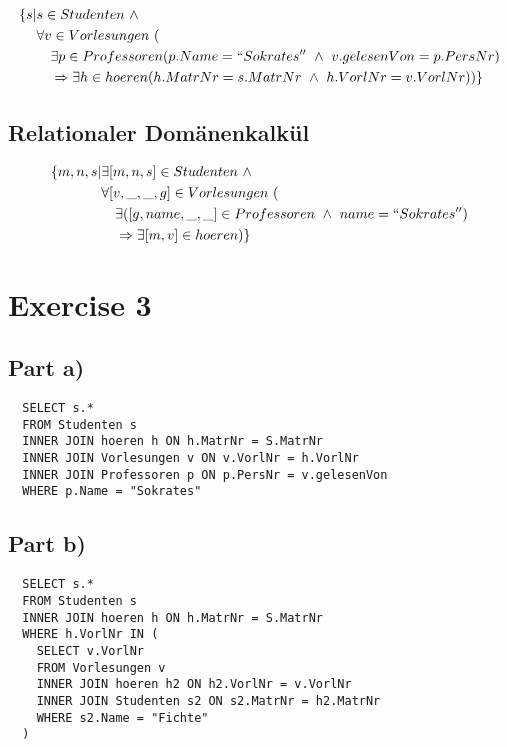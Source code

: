 \documentclass[10pt,a4paper]{article}
\begin{document}
\begin{align*}
  \{ s | & s \in Studenten\ \land\\
         & \forall v \in Vorlesungen\ (\\
         & \quad \exists p \in Professoren (p.Name = ``Sokrates''\ \land\ v.gelesenVon = p.PersNr)\\
         & \quad \Rightarrow \exists h \in hoeren (h.MatrNr = s.MatrNr\ \land\ h.VorlNr = v.VorlNr)) \}
\end{align*}

\subsection*{Relationaler Domänenkalkül}

\begin{align*}
  \{ m, n, s | & \exists [m, n, s] \in Studenten\ \land\\
               & \forall [v, \_, \_, g] \in Vorlesungen\ (\\
               & \quad \exists ([g, name, \_, \_] \in Professoren\ \land\ name = ``Sokrates'')\\
               & \quad \Rightarrow \exists [m, v] \in hoeren) \}
\end{align*}

\section*{Exercise 3}

\subsection*{Part a)}

\begin{verbatim}
  SELECT s.*
  FROM Studenten s
  INNER JOIN hoeren h ON h.MatrNr = S.MatrNr
  INNER JOIN Vorlesungen v ON v.VorlNr = h.VorlNr
  INNER JOIN Professoren p ON p.PersNr = v.gelesenVon
  WHERE p.Name = "Sokrates"
\end{verbatim}

\subsection*{Part b)}

\begin{verbatim}
  SELECT s.*
  FROM Studenten s
  INNER JOIN hoeren h ON h.MatrNr = S.MatrNr
  WHERE h.VorlNr IN (
    SELECT v.VorlNr
    FROM Vorlesungen v
    INNER JOIN hoeren h2 ON h2.VorlNr = v.VorlNr
    INNER JOIN Studenten s2 ON s2.MatrNr = h2.MatrNr
    WHERE s2.Name = "Fichte"
  )
\end{verbatim}
\end{document}
